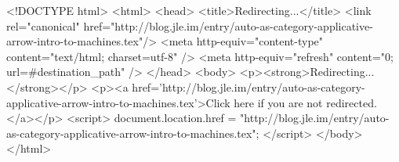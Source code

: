 <!DOCTYPE html>
<html>
<head>
<title>Redirecting...</title>
<link rel="canonical" href="http://blog.jle.im/entry/auto-as-category-applicative-arrow-intro-to-machines.tex"/>
<meta http-equiv="content-type" content="text/html; charset=utf-8" />
<meta http-equiv="refresh" content="0; url=#{destination_path}" />
</head>
<body>
  <p><strong>Redirecting...</strong></p>
  <p><a href='http://blog.jle.im/entry/auto-as-category-applicative-arrow-intro-to-machines.tex'>Click here if you are not redirected.</a></p>
  <script>
    document.location.href = "http://blog.jle.im/entry/auto-as-category-applicative-arrow-intro-to-machines.tex";
  </script>
</body>
</html>

